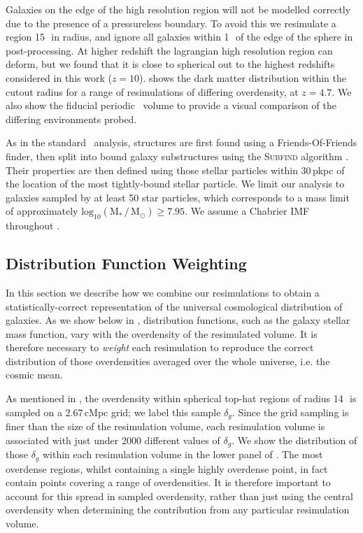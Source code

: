 Galaxies on the edge of the high resolution region will not be modelled correctly due to the presence of a pressureless boundary.
To avoid this we resimulate a region 15\,\cMpch\, in radius, and ignore all galaxies within 1\,\cMpch\, of the edge of the sphere in post-processing.
At higher redshift the lagrangian high resolution region can deform, but we found that it is close to spherical out to the highest redshifts considered in this work ($z = 10$).
 shows the dark matter distribution within the cutout radius for a range of resimulations of differing overdensity, at $z = 4.7$.
We also show the fiducial periodic \eagle\ volume to provide a visual comparison of the differing environments probed.

As in the standard \eagle\ analysis, structures are first found using a Friends-Of-Friends \citep[FOF,][]{davis_evolution_1985} finder, then split into bound galaxy substructures using the \textsc{Subfind} algorithm \citep{springel_populating_2001}.
Their properties are then defined using those stellar particles within 30\,pkpc of the location of the most tightly-bound stellar particle.
We limit our analysis to galaxies sampled by at least 50 star particles, which corresponds to a mass limit of approximately $\mathrm{log_{10}(M_{*}\,/\,M_{\odot})} \geqslant 7.95$.
We assume a Chabrier IMF throughout \citep{chabrier_galactic_2003}.

\subsection{Distribution Function Weighting}
\label{sec:method:weighting}

In this section we describe how we combine our resimulations to obtain a statistically-correct representation of the universal cosmological distribution of galaxies.
As we show below in , distribution functions, such as the galaxy stellar mass function, vary with the overdensity of the resimulated volume.
It is therefore necessary to \textit{weight} each resimulation to reproduce the correct distribution of those overdensities averaged over the whole universe, i.e. the cosmic mean.

As mentioned in , the overdensity within spherical top-hat regions of radius 14\,\cMpch\, is sampled on a 2.67\,cMpc grid; we label this sample $\delta_g$.
Since the grid sampling is finer than the size of the resimulation volume, each resimulation volume is associated with just under 2000 different values of $\delta_g$.
We show the distribution of those $\delta_g$ within each resimulation volume in the lower panel of .
The most overdense regions, whilst containing a single highly overdense point, in fact contain points covering a range of overdensities.
It is therefore important to account for this spread in sampled overdensity, rather than just using the central overdensity when determining the contribution from any particular resimulation volume.

